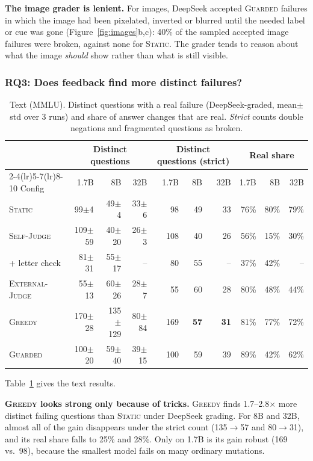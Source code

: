 \documentclass[sigconf]{acmart}
\newcommand{\HW}{\textsc{Static}}
\newcommand{\SJ}{\textsc{Self-Judge}}
\newcommand{\OJ}{\textsc{External-Judge}}
\newcommand{\BOLD}{\textsc{Greedy}}
\newcommand{\BR}{\textsc{Guarded}}
\newcommand{\pmstd}[1]{{\scriptsize$\pm$#1}}
\begin{document}
\textbf{The image grader is lenient.} For images, DeepSeek accepted \BR{} failures in which the image had been
pixelated, inverted or blurred until the needed label or cue was gone (Figure~\ref{fig:images}b,c): 40\% of the sampled
accepted image failures were broken, against none for \HW{}. The grader tends to reason about what the image
\emph{should} show rather than what is still visible.

\subsubsection{RQ3: Does feedback find more distinct failures?}

\begin{table}[t]
\centering
\caption{Text (MMLU). Distinct questions with a real failure (DeepSeek-graded, mean$\pm$std over 3 runs) and share of
answer changes that are real. \emph{Strict} counts double negations and fragmented questions as broken.}
\label{tab:text}
\small
\begin{tabular}{lrrrrrrrrr}
\toprule
 & \multicolumn{3}{c}{Distinct questions} & \multicolumn{3}{c}{Distinct questions (strict)} & \multicolumn{3}{c}{Real share} \\
\cmidrule(lr){2-4}\cmidrule(lr){5-7}\cmidrule(lr){8-10}
Config & 1.7B & 8B & 32B & 1.7B & 8B & 32B & 1.7B & 8B & 32B \\
\midrule
\HW{}           & 99\pmstd{4}   & 49\pmstd{4}   & 33\pmstd{6}  & 98  & 49 & 33 & 76\% & 80\% & 79\% \\
\SJ{}           & 109\pmstd{59} & 40\pmstd{20}  & 26\pmstd{3}  & 108 & 40 & 26 & 56\% & 15\% & 30\% \\
\quad + letter check & 81\pmstd{31} & 55\pmstd{17} & -- & 80 & 55 & -- & 37\% & 42\% & -- \\
\OJ{}           & 55\pmstd{13}  & 60\pmstd{26}  & 28\pmstd{7}  & 55  & 60 & 28 & 80\% & 48\% & 44\% \\
\BOLD{}         & 170\pmstd{28} & 135\pmstd{129}& 80\pmstd{84} & 169 & \textbf{57} & \textbf{31} & 81\% & 77\% & 72\% \\
\BR{}           & 100\pmstd{20} & 59\pmstd{40}  & 39\pmstd{15} & 100 & 59 & 39 & 89\% & 42\% & 62\% \\
\bottomrule
\end{tabular}
\end{table}



Table~\ref{tab:text} gives the text results.

\textbf{\BOLD{} looks strong only because of tricks.} \BOLD{} finds 1.7--2.8$\times$ more distinct failing questions
than \HW{} under DeepSeek grading. For 8B and 32B, almost all of the gain disappears under the strict count
(135$\to$57 and 80$\to$31), and its real share falls to 25\% and 28\%. Only on 1.7B is its gain robust (169 vs.\ 98),
because the smallest model fails on many ordinary mutations.
\end{document}
